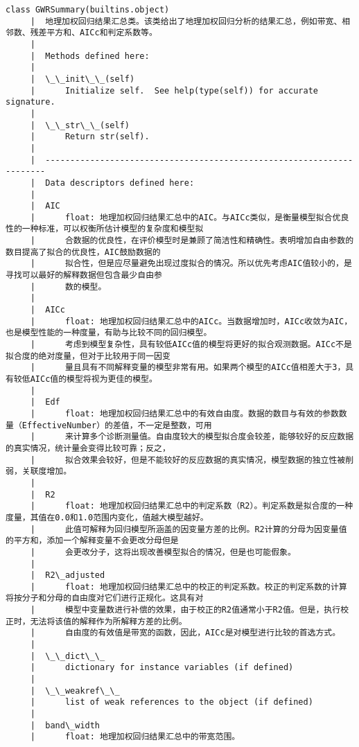\documentclass[11pt]{article}
\begin{document}
\begin{Verbatim}[commandchars=\\\{\}]
    class GWRSummary(builtins.object)
     |  地理加权回归结果汇总类。该类给出了地理加权回归分析的结果汇总，例如带宽、相邻数、残差平方和、AICc和判定系数等。
     |  
     |  Methods defined here:
     |  
     |  \_\_init\_\_(self)
     |      Initialize self.  See help(type(self)) for accurate signature.
     |  
     |  \_\_str\_\_(self)
     |      Return str(self).
     |  
     |  ----------------------------------------------------------------------
     |  Data descriptors defined here:
     |  
     |  AIC
     |      float: 地理加权回归结果汇总中的AIC。与AICc类似，是衡量模型拟合优良性的一种标准，可以权衡所估计模型的复杂度和模型拟
     |      合数据的优良性，在评价模型时是兼顾了简洁性和精确性。表明增加自由参数的数目提高了拟合的优良性，AIC鼓励数据的
     |      拟合性，但是应尽量避免出现过度拟合的情况。所以优先考虑AIC值较小的，是寻找可以最好的解释数据但包含最少自由参
     |      数的模型。
     |  
     |  AICc
     |      float: 地理加权回归结果汇总中的AICc。当数据增加时，AICc收敛为AIC，也是模型性能的一种度量，有助与比较不同的回归模型。
     |      考虑到模型复杂性，具有较低AICc值的模型将更好的拟合观测数据。AICc不是拟合度的绝对度量，但对于比较用于同一因变
     |      量且具有不同解释变量的模型非常有用。如果两个模型的AICc值相差大于3，具有较低AICc值的模型将视为更佳的模型。
     |  
     |  Edf
     |      float: 地理加权回归结果汇总中的有效自由度。数据的数目与有效的参数数量（EffectiveNumber）的差值，不一定是整数，可用
     |      来计算多个诊断测量值。自由度较大的模型拟合度会较差，能够较好的反应数据的真实情况，统计量会变得比较可靠；反之，
     |      拟合效果会较好，但是不能较好的反应数据的真实情况，模型数据的独立性被削弱，关联度增加。
     |  
     |  R2
     |      float: 地理加权回归结果汇总中的判定系数（R2）。判定系数是拟合度的一种度量，其值在0.0和1.0范围内变化，值越大模型越好。
     |      此值可解释为回归模型所涵盖的因变量方差的比例。R2计算的分母为因变量值的平方和，添加一个解释变量不会更改分母但是
     |      会更改分子，这将出现改善模型拟合的情况，但是也可能假象。
     |  
     |  R2\_adjusted
     |      float: 地理加权回归结果汇总中的校正的判定系数。校正的判定系数的计算将按分子和分母的自由度对它们进行正规化。这具有对
     |      模型中变量数进行补偿的效果，由于校正的R2值通常小于R2值。但是，执行校正时，无法将该值的解释作为所解释方差的比例。
     |      自由度的有效值是带宽的函数，因此，AICc是对模型进行比较的首选方式。
     |  
     |  \_\_dict\_\_
     |      dictionary for instance variables (if defined)
     |  
     |  \_\_weakref\_\_
     |      list of weak references to the object (if defined)
     |  
     |  band\_width
     |      float: 地理加权回归结果汇总中的带宽范围。

\end{Verbatim}
\end{document}

